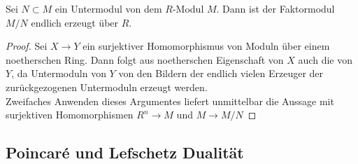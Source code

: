\begin{lem}
	\label{lem:quotient}
	Sei $N\subset M$ ein Untermodul von dem $R$-Modul $M$. Dann ist der Faktormodul $M/N$ endlich erzeugt über $R$.
\end{lem}
\begin{proof}
	Sei $X \to Y$ ein surjektiver Homomorphismus von Moduln über einem noetherschen Ring. Dann folgt aus noetherschen Eigenschaft von $X$ auch die von $Y$, da Untermoduln von $Y$ von den Bildern der endlich vielen Erzeuger der zurückgezogenen Untermoduln erzeugt werden. \\
	Zweifaches Anwenden dieses Argumentes liefert unmittelbar die Aussage mit surjektiven Homomorphismen $R^n \to M$ und $M \to M/N$
\end{proof}

\subsection{Poincaré und Lefschetz Dualität}
\label{sec:poinc}

